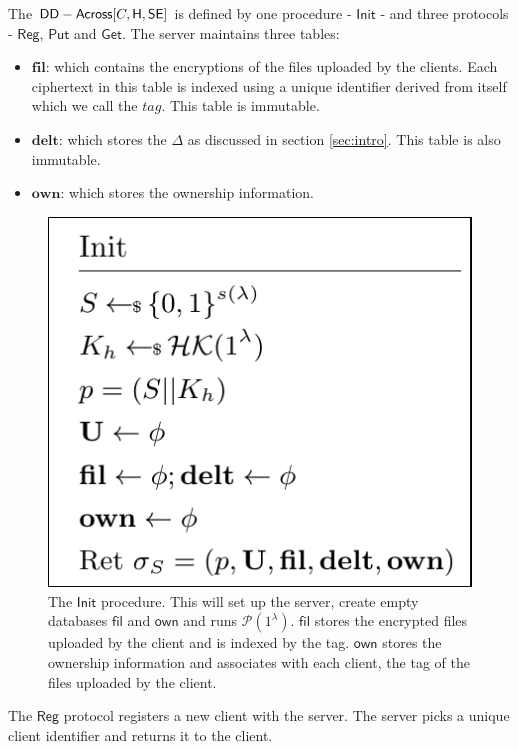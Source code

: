 The $\mathsf{DD-Across} [C, \mathsf{H}, \mathsf{SE}]$ is defined by one procedure - $\mathsf{Init}$ - and three protocols - $\mathsf{Reg}$, $\mathsf{Put}$ and $\mathsf{Get}$. The server maintains three tables:
\begin{itemize}
	\item $\textbf{fil}$: which contains the encryptions of the files uploaded by the clients. Each ciphertext in this table is indexed using a unique identifier derived from itself which we call the $tag$. This table is immutable.
	\item $\textbf{delt}$: which stores the $\Delta$ as discussed in section \ref{sec:intro}. This table is also immutable.
	\item $\textbf{own}$: which stores the ownership information.
\end{itemize}
\begin{figure}[H]
	\centering
	\includegraphics[scale=0.5]{init}    
	\caption{The $\mathsf{Init}$ procedure. This will set up the server, create empty databases $\mathsf{fil}$ and $\mathsf{own}$ and runs $\mathcal{P}(1^{\lambda})$. $\mathsf{fil}$ stores the encrypted files uploaded by the client and is indexed by the tag. $\mathsf{own}$ stores the ownership information and associates with each client, the tag of the files uploaded by the client.}
\end{figure}

\noindent
The $\mathsf{Reg}$ protocol registers a new client with the server. The server picks a unique client identifier and returns it to the client.

